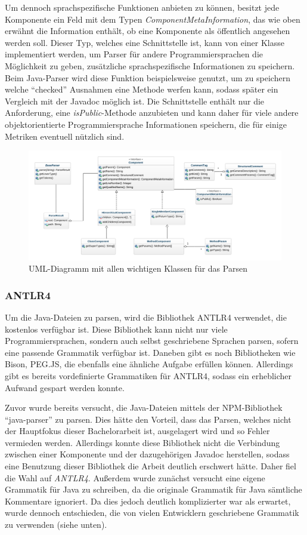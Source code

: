 Um dennoch sprachspezifische Funktionen anbieten zu können, besitzt jede Komponente ein Feld mit dem Typen \textit{ComponentMetaInformation}, das wie oben erwähnt die Information enthält, ob eine Komponente als öffentlich angesehen werden soll. Dieser Typ, welches eine Schnittstelle ist, kann von einer Klasse implementiert werden, um Parser für andere Programmiersprachen die Möglichkeit zu geben, zusätzliche sprachspezifische Informationen zu speichern. Beim Java-Parser wird diese Funktion beispielsweise genutzt, um zu speichern welche \enquote{checked} Ausnahmen eine Methode werfen kann, sodass später ein Vergleich mit der Javadoc möglich ist. Die Schnittstelle enthält nur die Anforderung, eine \textit{isPublic}-Methode anzubieten und kann daher für viele andere objektorientierte Programmiersprache Informationen speichern, die für einige Metriken eventuell nützlich sind. 
\begin{figure}
    \centering
    \includegraphics[width=\columnwidth]{figures/uml/parsing.png}
    \caption{UML-Diagramm mit allen wichtigen Klassen für das Parsen}
    \label{fig:uml_parsing}
\end{figure}

\subsubsection{ANTLR4}
Um die Java-Dateien zu parsen, wird die Bibliothek ANTLR4 verwendet, die kostenlos verfügbar ist. Diese Bibliothek kann nicht nur viele Programmiersprachen, sondern auch selbst geschriebene Sprachen parsen, sofern eine passende Grammatik verfügbar ist. Daneben gibt es noch Bibliotheken wie Bison, PEG.JS, die ebenfalls eine ähnliche Aufgabe erfüllen können. Allerdings gibt es bereits vordefinierte Grammatiken für ANTLR4, sodass ein erheblicher Aufwand gespart werden konnte.  

Zuvor wurde bereits versucht, die Java-Dateien mittels der NPM-Bibliothek \enquote{java-parser} \cite{Java-parser} zu parsen. Dies hätte den Vorteil, dass das Parsen, welches nicht der Hauptfokus dieser Bachelorarbeit ist, ausgelagert wird und so Fehler vermieden werden. Allerdings konnte diese Bibliothek nicht die Verbindung zwischen einer Komponente und der dazugehörigen Javadoc herstellen, sodass eine Benutzung dieser Bibliothek die Arbeit deutlich erschwert hätte. Daher fiel die Wahl auf \textit{ANTLR4}. Außerdem wurde zunächst versucht eine eigene Grammatik für Java zu schreiben, da die originale Grammatik für Java sämtliche Kommentare ignoriert. Da dies jedoch deutlich komplizierter war als erwartet, wurde dennoch entschieden, die von vielen Entwicklern geschriebene Grammatik zu verwenden (siehe unten).

